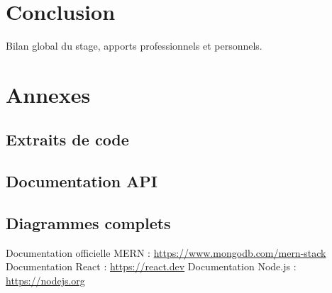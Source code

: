 \documentclass[12pt,a4paper]{report}
\begin{document}
\chapter{Conclusion}
Bilan global du stage, apports professionnels et personnels.  

\appendix
\chapter{Annexes}
\section{Extraits de code}
\section{Documentation API}
\section{Diagrammes complets}

\begin{thebibliography}{9}
 Documentation officielle MERN : \url{https://www.mongodb.com/mern-stack}
 Documentation React : \url{https://react.dev}
 Documentation Node.js : \url{https://nodejs.org}
\end{thebibliography}
\end{document}

